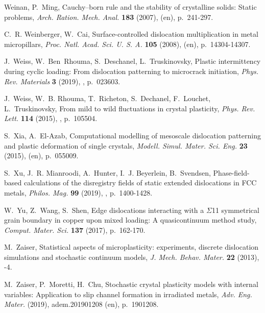 \documentclass[CRPHYS,Unicode,manuscript]{cedram}
\begin{document}
\begin{thebibliography}{100}
{Weinan}, P.~Ming, {\og Cauchy--born rule and the stability of crystalline
  solids: Static problems\fg}, \emph{Arch. Ration. Mech. Anal.} \textbf{183}
  (2007),  (en), p.~241-297.

C.~R. Weinberger, W.~Cai, {\og Surface-controlled dislocation multiplication in
  metal micropillars\fg}, \emph{Proc. Natl. Acad. Sci. U. S. A.} \textbf{105}
  (2008),  (en), p.~14304-14307.

J.~Weiss, W.~Ben~Rhouma, S.~Deschanel, L.~Truskinovsky, {\og Plastic
  intermittency during cyclic loading: From dislocation patterning to
  microcrack initiation\fg}, \emph{Phys. Rev. Materials} \textbf{3} (2019),
  , p.~023603.

J.~Weiss, W.~B. Rhouma, T.~Richeton, S.~Dechanel, F.~Louchet, L.~Truskinovsky,
  {\og From mild to wild fluctuations in crystal plasticity\fg}, \emph{Phys.
  Rev. Lett.} \textbf{114} (2015), , p.~105504.

S.~Xia, A.~El-Azab, {\og Computational modelling of mesoscale dislocation
  patterning and plastic deformation of single crystals\fg}, \emph{Modell.
  Simul. Mater. Sci. Eng.} \textbf{23} (2015),  (en), p.~055009.

S.~Xu, J.~R. Mianroodi, A.~Hunter, I.~J. Beyerlein, B.~Svendsen, {\og
  Phase-field-based calculations of the disregistry fields of static extended
  dislocations in {FCC} metals\fg}, \emph{Philos. Mag.} \textbf{99} (2019),
  , p.~1400-1428.

W.~Yu, Z.~Wang, S.~Shen, {\og Edge dislocations interacting with a {$\Sigma$11}
  symmetrical grain boundary in copper upon mixed loading: A quasicontinuum
  method study\fg}, \emph{Comput. Mater. Sci.} \textbf{137} (2017), p.~162-170.

M.~Zaiser, {\og Statistical aspects of microplasticity: experiments, discrete
  dislocation simulations and stochastic continuum models\fg}, \emph{J. Mech.
  Behav. Mater.} \textbf{22} (2013), -4.

M.~Zaiser, P.~Moretti, H.~Chu, {\og Stochastic crystal plasticity models with
  internal variables: Application to slip channel formation in irradiated
  metals\fg}, \emph{Adv. Eng. Mater.} (2019), \cdrnumero adem.201901208 (en),
  p.~1901208.


\end{thebibliography}
\end{document}
